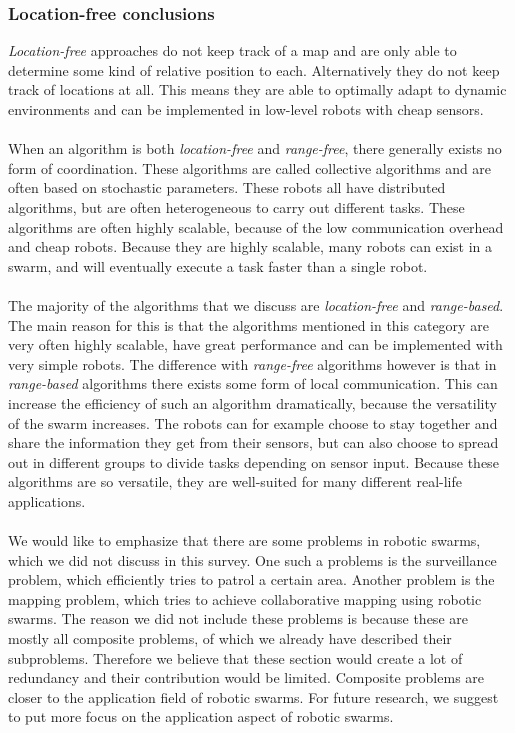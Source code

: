 \subsubsection*{Location-free conclusions} 
\emph{Location-free} approaches do not keep track of a map and are only able to determine some kind of relative position to each.
Alternatively they do not keep track of locations at all. 
This means they are able to optimally adapt to dynamic environments and can be implemented in low-level robots with cheap sensors. \\
\\
When an algorithm is both \emph{location-free} and \emph{range-free}, there generally exists no form of coordination. 
These algorithms are called collective algorithms and are often based on stochastic parameters. 
These robots all have distributed algorithms, but are often heterogeneous to carry out different tasks.
These algorithms are often highly scalable, because of the low communication overhead and cheap robots. 
Because they are highly scalable, many robots can exist in a swarm, and will eventually execute a task faster than a single robot.\\
\\
The majority of the algorithms that we discuss are \emph{location-free} and \emph{range-based}.
The main reason for this is that the algorithms mentioned in this category are very often highly scalable, have great performance and can be implemented with very simple robots. 
The difference with \emph{range-free} algorithms however is that in \emph{range-based} algorithms there exists some form of local communication.
This can increase the efficiency of such an algorithm dramatically, because the versatility of the swarm increases.
The robots can for example choose to stay together and share the information they get from their sensors, but can also choose to spread out in different groups to divide tasks depending on sensor input. 
Because these algorithms are so versatile, they are well-suited for many different real-life applications.\\
\\
We would like to emphasize that there are some problems in robotic swarms, which we did not discuss in this survey.
One such a problems is the surveillance problem, which efficiently tries to patrol a certain area. 
Another problem is the mapping problem, which tries to achieve collaborative mapping using robotic swarms.
The reason we did not include these problems is because these are mostly all composite problems, of which we already have described their subproblems.
Therefore we believe that these section would create a lot of redundancy and their contribution would be limited.
Composite problems are closer to the application field of robotic swarms.
For future research, we suggest to put more focus on the application aspect of robotic swarms. 

